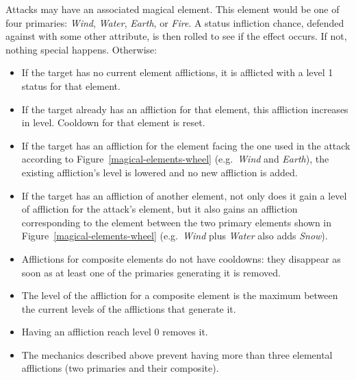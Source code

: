 Attacks may have an associated magical element. This element would be one
of four primaries: \textit{Wind}, \textit{Water}, \textit{Earth}, or
\textit{Fire}. A status infliction chance, defended against with some other
attribute, is then rolled to see if the effect occurs. If not, nothing special
happens. Otherwise:
\begin{itemize}
\item
   If the target has no current element afflictions, it is afflicted with a
   level 1 status for that element.
\item
   If the target already has an affliction for that element, this affliction
   increases in level. Cooldown for that element is reset.
\item
   If the target has an affliction for the element facing the one used in the
   attack according to Figure~\ref{magical-elements-wheel} (e.g.~\textit{Wind}
   and \textit{Earth}), the existing affliction's level is lowered and no new
   affliction is added.
\item
   If the target has an affliction of another element, not only does it gain
   a level of affliction for the attack's element, but it also gains an
   affliction corresponding to the element between the two primary elements
   shown in Figure~\ref{magical-elements-wheel} (e.g.~\textit{Wind} plus
   \textit{Water} also adds \textit{Snow}).
\end{itemize}

\begin{itemize}
\item
   Afflictions for composite elements do not have cooldowns: they disappear as
   soon as at least one of the primaries generating it is removed.
\item
   The level of the affliction for a composite element is the maximum between
   the current levels of the afflictions that generate it.
\item
   Having an affliction reach level 0 removes it.
\item
   The mechanics described above prevent having more than three elemental
   afflictions (two primaries and their composite).
\end{itemize}
